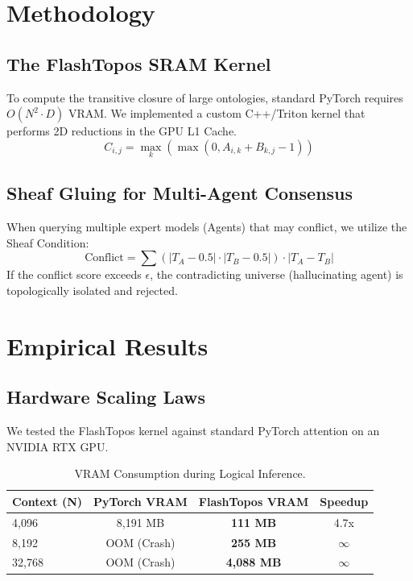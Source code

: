 \documentclass[11pt,a4paper]{article}
\begin{document}
\section{Methodology}
\subsection{The FlashTopos SRAM Kernel}
To compute the transitive closure of large ontologies, standard PyTorch requires $O(N^2 \cdot D)$ VRAM. We implemented a custom C++/Triton kernel that performs 2D reductions in the GPU L1 Cache.
\begin{equation}
C_{i,j} = \max_k (\max(0, A_{i,k} + B_{k,j} - 1))
\end{equation}

\subsection{Sheaf Gluing for Multi-Agent Consensus}
When querying multiple expert models (Agents) that may conflict, we utilize the Sheaf Condition:
\begin{equation}
\text{Conflict} = \sum (|T_A - 0.5| \cdot |T_B - 0.5|) \cdot |T_A - T_B|
\end{equation}
If the conflict score exceeds $\epsilon$, the contradicting universe (hallucinating agent) is topologically isolated and rejected.

\section{Empirical Results}

\subsection{Hardware Scaling Laws}
We tested the FlashTopos kernel against standard PyTorch attention on an NVIDIA RTX GPU.
\begin{table}[h]
\centering
\begin{tabular}{@{}lccc@{}}
\toprule
\textbf{Context (N)} & \textbf{PyTorch VRAM} & \textbf{FlashTopos VRAM} & \textbf{Speedup} \\
\midrule
4,096 & 8,191 MB & \textbf{111 MB} & 4.7x \\
8,192 & OOM (Crash) & \textbf{255 MB} & $\infty$ \\
32,768 & OOM (Crash) & \textbf{4,088 MB} & $\infty$ \\
\bottomrule
\end{tabular}
\caption{VRAM Consumption during Logical Inference.}
\end{table}
\end{document}
